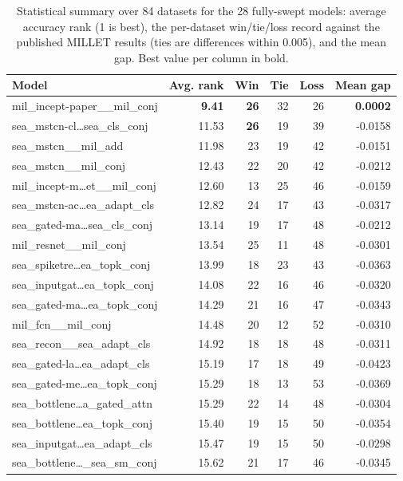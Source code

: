 \begin{table}[t]
\centering
\small
\caption{Statistical summary over 84 datasets for the 28 fully-swept models: average accuracy rank (1 is best), the per-dataset win/tie/loss record against the published MILLET results (ties are differences within 0.005), and the mean gap. Best value per column in bold.}
\label{tab:ranking_accuracy}
\begin{tabular}{lrrrrr}
\toprule
Model & Avg. rank & Win & Tie & Loss & Mean gap \\
\midrule
mil\_incept-paper\_\_mil\_conj & \textbf{9.41} & \textbf{26} & 32 & 26 & \textbf{0.0002} \\
sea\_mstcn-cl\dots{}sea\_cls\_conj & 11.53 & \textbf{26} & 19 & 39 & -0.0158 \\
sea\_mstcn\_\_mil\_add & 11.98 & 23 & 19 & 42 & -0.0151 \\
sea\_mstcn\_\_mil\_conj & 12.43 & 22 & 20 & 42 & -0.0212 \\
mil\_incept-m\dots{}et\_\_mil\_conj & 12.60 & 13 & 25 & 46 & -0.0159 \\
sea\_mstcn-ac\dots{}ea\_adapt\_cls & 12.82 & 24 & 17 & 43 & -0.0317 \\
sea\_gated-ma\dots{}sea\_cls\_conj & 13.14 & 19 & 17 & 48 & -0.0212 \\
mil\_resnet\_\_mil\_conj & 13.54 & 25 & 11 & 48 & -0.0301 \\
sea\_spiketre\dots{}ea\_topk\_conj & 13.99 & 18 & 23 & 43 & -0.0363 \\
sea\_inputgat\dots{}ea\_topk\_conj & 14.08 & 22 & 16 & 46 & -0.0320 \\
sea\_gated-ma\dots{}ea\_topk\_conj & 14.29 & 21 & 16 & 47 & -0.0343 \\
mil\_fcn\_\_mil\_conj & 14.48 & 20 & 12 & 52 & -0.0310 \\
sea\_recon\_\_sea\_adapt\_cls & 14.92 & 18 & 18 & 48 & -0.0311 \\
sea\_gated-la\dots{}ea\_adapt\_cls & 15.19 & 17 & 18 & 49 & -0.0423 \\
sea\_gated-me\dots{}ea\_topk\_conj & 15.29 & 18 & 13 & 53 & -0.0369 \\
sea\_bottlene\dots{}a\_gated\_attn & 15.29 & 22 & 14 & 48 & -0.0304 \\
sea\_bottlene\dots{}ea\_topk\_conj & 15.40 & 19 & 15 & 50 & -0.0354 \\
sea\_inputgat\dots{}ea\_adapt\_cls & 15.47 & 19 & 15 & 50 & -0.0298 \\
sea\_bottlene\dots{}\_sea\_sm\_conj & 15.62 & 21 & 17 & 46 & -0.0345 \\

\end{tabular}
\end{table}
